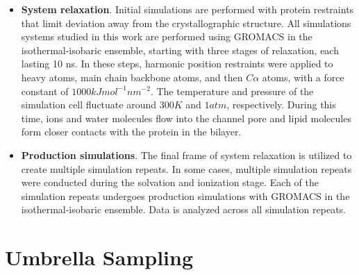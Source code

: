 \begin{refsection}
\begin{itemize}
\item \textbf{System relaxation}. Initial simulations are performed with protein restraints that limit deviation away from the crystallographic structure. All simulations systems studied in this work are performed using GROMACS \cite{Abraham:2015gj,Hess:2008db,Pronk:2013ef} in the isothermal-isobaric ensemble, starting with three stages of relaxation, each lasting 10 ns. In these steps, harmonic position restraints were applied to heavy atoms, main chain backbone atoms, and then $C\alpha$ atoms, with a force constant of $1000 kJ mol^{-1} nm^{-2}$. The temperature and pressure of the simulation cell fluctuate around $300 K$ and $1 atm$, respectively. During this time, ions and water molecules flow into the channel pore and lipid molecules form closer contacts with the protein in the bilayer.
\item \textbf{Production simulations}. The final frame of system relaxation is utilized to create multiple simulation repeats. In some cases, multiple simulation repeats were conducted during the solvation and ionization stage. Each of the simulation repeats undergoes production simulations with GROMACS \cite{Abraham:2015gj,Hess:2008db,Pronk:2013ef} in the isothermal-isobaric ensemble. Data is analyzed across all simulation repeats.
\end{itemize}

\section{Umbrella Sampling}


\end{refsection}
